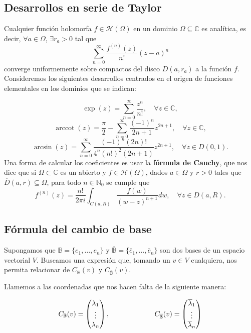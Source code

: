 \documentclass[a4paper,10pt]{article}
\DeclareMathOperator{\arccot}{arccot}
\theoremstyle{teorema}
\theoremstyle{plano}
\theoremstyle{titulo}
\begin{document}
\subsection{Desarrollos en serie de Taylor}
Cualquier función holomorfa $f\in\mathcal{H}(\Omega)$ en un dominio $\Omega\subseteq\mathbb{C}$ es analítica, es decir, $\forall a\in\Omega$, $\exists r_a>0$ tal que
\[\sum_{n=0}^\infty\frac{f^{(n)}(z)}{n!}(z-a)^n\]
converge uniformemente sobre compactos del disco $D(a,r_a)$ a la función $f$. Consideremos los siguientes desarrollos centrados en el origen de funciones elementales en los dominios que se indican:

\[\exp(z)=\sum_{n=0}^\infty\frac{z^n}{n!},\quad\forall z\in\mathbb{C},\]
\[\arccot(z)=\frac{\pi}{2}-\sum_{n=0}^\infty\frac{(-1)^n}{2n+1}z^{2n+1},\quad\forall z\in\mathbb{C},\]
\[\arcsin(z)=\sum_{n=0}^\infty\frac{(-1)^n (2n)!}{4^n(n!)^2(2n+1)}z^{2n+1},\quad\forall z\in D(0,1).\]
Una forma de calcular los coeficientes es usar la \textbf{fórmula de Cauchy}, que nos dice que si $\Omega\subset\mathbb{C}$ es un abierto y $f\in\mathcal{H}(\Omega)$, dados $a\in\Omega$ y $r>0$ tales que $\overline{D}(a,r)\subseteq\Omega$, para todo $n\in\mathbb{N}_0$ se cumple que
\[f^{(n)}(z)=\frac{n!}{2\pi i}\int_{C(a,R)}\frac{f(w)}{(w-z)^{n+1}}dw,\quad \forall z\in D(a,R).\]

\subsection{Fórmula del cambio de base}

Supongamos que $\mathbb{B}=\{e_1,\ldots,e_n\}$ y $\overline{\mathbb{B}}=\{\overline{e}_1,\ldots,\overline{e}_n\}$ son dos bases de un espacio vectorial $V$. Buscamos una expresión que, tomando un $v\in V$ cualquiera, nos permita relacionar de $C_\mathbb{B}(v)$ y $C_{\overline{\mathbb{B}}}(v)$.

Llamemos a las coordenadas que nos hacen falta de la siguiente manera: 

\[C_\mathbb{B}(v)=\begin{pmatrix}\lambda_1 \\ \vdots \\ \lambda_n\end{pmatrix},\hspace{22.5mm} C_{\overline{\mathbb{B}}}(v)=\begin{pmatrix}\overline{\lambda}_1 \\ \vdots \\ \overline{\lambda}_n\end{pmatrix}\]
\end{document}
